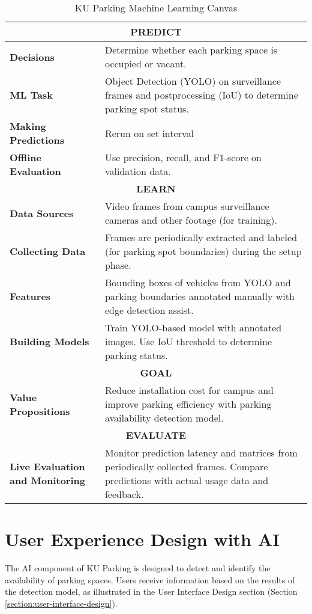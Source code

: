 \begin{table}[H]
\centering
\caption{KU Parking Machine Learning Canvas}
\label{tab:ml-canvas}
\begin{tabular}{|p{4cm}|p{10cm}|}
\hline
\multicolumn{2}{|c|}{\cellcolor{cyan!15}\textbf{PREDICT}} \\ \hline
\textbf{Decisions} & Determine whether each parking space is occupied or vacant.\\ \hline
\textbf{ML Task} & Object Detection (YOLO) on surveillance frames and postprocessing (IoU) to determine parking spot status.\\ \hline
\textbf{Making Predictions} & Rerun on set interval\\ \hline
\textbf{Offline Evaluation} & Use precision, recall, and F1-score on validation data. \\ \hline

\multicolumn{2}{|c|}{\cellcolor{yellow!15}\textbf{LEARN}} \\ \hline
\textbf{Data Sources} & Video frames from campus surveillance cameras and other footage (for training). \\ \hline
\textbf{Collecting Data} & Frames are periodically extracted and labeled (for parking spot boundaries) during the setup phase. \\ \hline
\textbf{Features} & Bounding boxes of vehicles from YOLO and parking boundaries annotated manually with edge detection assist. \\ \hline
\textbf{Building Models} & Train YOLO-based model with annotated images. Use IoU threshold to determine parking status. \\ \hline

\multicolumn{2}{|c|}{\textbf{GOAL}} \\ \hline\textbf{Value Propositions} & Reduce installation cost for campus and improve parking efficiency with parking availability detection model. \\ \hline

\multicolumn{2}{|c|}{\cellcolor{purple!15}\textbf{EVALUATE}} \\ \hline
\textbf{Live Evaluation and Monitoring} & Monitor prediction latency and matrices from periodically collected frames. Compare predictions with actual usage data and feedback. \\ \hline

\end{tabular}
\end{table}

\clearpage
\section{User Experience Design with AI}
\label{section:user-experience-with-ai}
The AI component of KU Parking is designed to detect and identify the availability of parking spaces. Users receive information based on the results of the detection model, as illustrated in the User Interface Design section (Section \ref{section:user-interface-design}).

